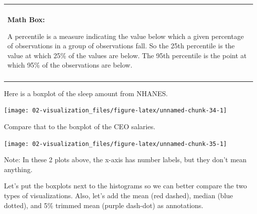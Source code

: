 \documentclass[
]{book}
\newenvironment{Shaded}{\begin{snugshade}}{\end{snugshade}}
\newcommand{\DataTypeTok}[1]{\textcolor[rgb]{0.13,0.29,0.53}{#1}}
\newcommand{\KeywordTok}[1]{\textcolor[rgb]{0.13,0.29,0.53}{\textbf{#1}}}
\newcommand{\NormalTok}[1]{#1}
\newcommand{\OperatorTok}[1]{\textcolor[rgb]{0.81,0.36,0.00}{\textbf{#1}}}
\newcommand{\StringTok}[1]{\textcolor[rgb]{0.31,0.60,0.02}{#1}}
\newenvironment{mathbox}
{
    \begin{center}
    
    \begin{tabular}{|p{0.8\textwidth}|}
    \rowcolor{LightYellow}
    \hline\\
    \rowcolor{LightYellow}
    \textbf{Math Box:}
}
{
    \\\rowcolor{LightYellow}
    \\\hline
    \end{tabular} 
    \end{center}
}
\begin{document}
\begin{mathbox}
A percentile is a measure indicating the value below which a given
percentage of observations in a group of observations fall. So the 25th
percentile is the value at which 25\% of the values are below. The 95th
percentile is the point at which 95\% of the observations are below.
\end{mathbox}

Here is a boxplot of the sleep amount from NHANES.

\begin{Shaded}
\end{Shaded}

\begin{center}\texttt{[image: 02-visualization\_files/figure-latex/unnamed-chunk-34-1]} \end{center}

Compare that to the boxplot of the CEO salaries.

\begin{Shaded}
\end{Shaded}

\begin{center}\texttt{[image: 02-visualization\_files/figure-latex/unnamed-chunk-35-1]} \end{center}

Note: In these 2 plots above, the x-axis has number labels, but they don't mean anything.

Let's put the boxplots next to the histograms so we can better compare the two types of visualizations. Also, let's add the mean (red dashed), median (blue dotted), and 5\% trimmed mean (purple dash-dot) as annotations.
\end{document}

